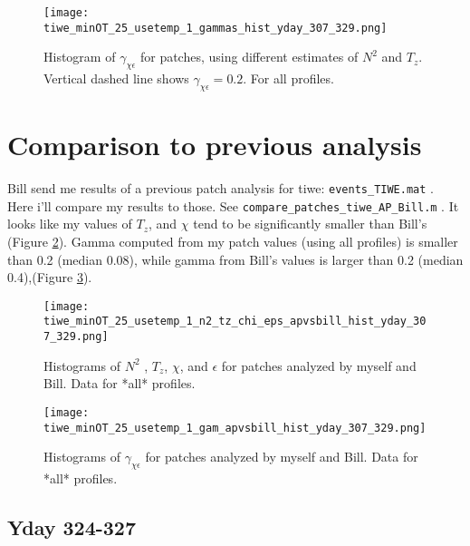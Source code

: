 \documentclass[11pt]{article}
\begin{document}
\begin{figure}[htbp]
\texttt{[image: tiwe\_minOT\_25\_usetemp\_1\_gammas\_hist\_yday\_307\_329.png]}
\caption{Histogram of $\gamma_{\chi\epsilon}$ for patches, using different estimates of $N^2$ and $T_z$. Vertical dashed line shows $\gamma_{\chi\epsilon}=0.2$. For all profiles.}
\label{patchgam}
\end{figure}
%
%




\clearpage
\section{Comparison to previous analysis}

Bill send me results of a previous patch analysis for tiwe: \verb+events_TIWE.mat+ . Here i'll compare my results to those. See \verb+compare_patches_tiwe_AP_Bill.m+ . It looks like my values of $T_z$, and $\chi$ tend to be significantly smaller than Bill's (Figure \ref{comp_bill_ap_1}). Gamma computed from my patch values (using all profiles) is smaller than 0.2 (median 0.08), while gamma from Bill's values is larger than 0.2 (median 0.4),(Figure \ref{comp_bill_ap_gam}).


\begin{figure}[htbp]
\texttt{[image: tiwe\_minOT\_25\_usetemp\_1\_n2\_tz\_chi\_eps\_apvsbill\_hist\_yday\_307\_329.png]}
\caption{Histograms of $N^2$ , $T_z$, $\chi$, and $\epsilon$ for patches analyzed by myself and Bill. Data for *all* profiles.}
\label{comp_bill_ap_1}
\end{figure}
%

\begin{figure}[htbp]
\texttt{[image: tiwe\_minOT\_25\_usetemp\_1\_gam\_apvsbill\_hist\_yday\_307\_329.png]}
\caption{Histograms of $\gamma_{\chi\epsilon}$ for patches analyzed by myself and Bill. Data for *all* profiles.}
\label{comp_bill_ap_gam}
\end{figure}



\clearpage
\subsection{Yday 324-327}
\end{document}
